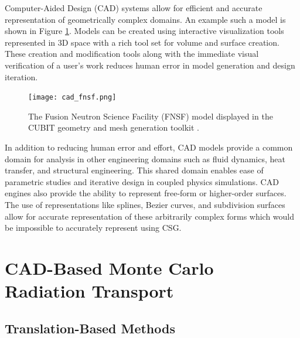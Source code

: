 Computer-Aided Design (CAD) systems allow for efficient and accurate
representation of geometrically complex domains. An example such a model is
shown in Figure \ref{fig:cad_fnsf}. Models can be created using interactive
visualization tools represented in 3D space with a rich tool set for volume and
surface creation. These creation and modification tools along with the immediate
visual verification of a user's work reduces human error in model generation and
design iteration.

\begin{figure}[H]
  \centering
  \texttt{[image: cad\_fnsf.png]}
  \caption[CAD image of the FNSF facility.]{The Fusion Neutron Science Facility (FNSF)\cite{Kessel_2017} model
    displayed in the CUBIT geometry and mesh generation toolkit \cite{Blacker_1994}.}
  \label{fig:cad_fnsf}
\end{figure}

In addition to reducing human error and effort, CAD models provide a common
domain for analysis in other engineering domains such as fluid dynamics, heat
transfer, and structural engineering. This shared domain enables ease of
parametric studies and iterative design in coupled physics simulations. CAD
engines also provide the ability to represent free-form or higher-order
surfaces. The use of representations like splines, Bezier curves, and
subdivision surfaces allow for accurate representation of these arbitrarily
complex forms which would be impossible to accurately represent using CSG.

\section{CAD-Based Monte Carlo Radiation Transport}\label{sec:CAD-MCRT}

\subsection{Translation-Based Methods}

